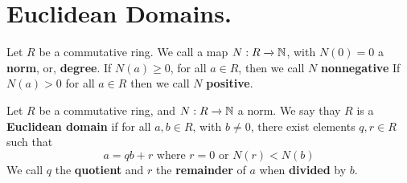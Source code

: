 \section{Euclidean Domains.}

\begin{definition}
    Let $R$ be a commutative ring. We call a map  $N:R \xrightarrow{} \mathbb{N}$, with
    $N(0)=0$ a \textbf{norm}, or, \textbf{degree}. If $N(a) \geq 0$, for all $a
    \in R$, then we call $N$ \textbf{nonnegative} If $N(a)>0$ for all $a \in R$
    then we call  $N$ \textbf{positive}.
\end{definition}

\begin{definition}
    Let $R$ be a commutative ring, and  $N:R \xrightarrow{} \mathbb{N}$ a norm. We say
    thay $R$ is a \textbf{Euclidean domain} if for all $a,b \in R$, with $b \neq
    0$, there exist elements  $q,r \in R$ such that
    \begin{equation*}
        a=qb+r \text{ where } r=0 \text{ or } N(r)<N(b)
    \end{equation*}
    We call $q$ the  \textbf{quotient} and $r$ the  \textbf{remainder} of $a$
    when  \textbf{divided} by $b$.
\end{definition}

